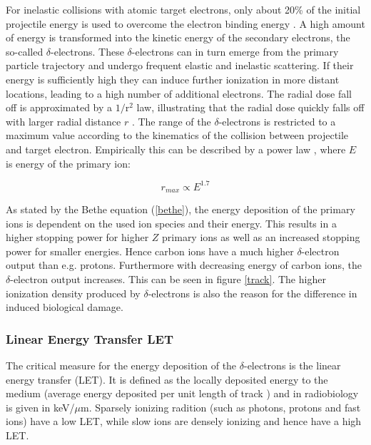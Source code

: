 For inelastic collisions with atomic target electrons, only about 20\% of the initial projectile energy is used to overcome the 
electron binding energy \cite{Kra92}. A high amount of energy is transformed into the kinetic energy of the secondary electrons, the 
so-called $\delta$-electrons. These $\delta$-electrons can in turn emerge from the primary particle trajectory and undergo frequent 
elastic and inelastic scattering. If their energy is sufficiently high they can induce further ionization in more distant locations, 
leading to a high number of additional electrons. The radial dose fall off is approximated by a $\mathrm{1}/\mathrm{r^{2}}$ law, 
illustrating that the radial dose quickly falls off with larger radial distance $r$ \cite{Cha76, Kat99, Ric12}. 
The range of the $\delta$-electrons is restricted to a maximum value according to the kinematics of the collision between projectile 
and target electron. Empirically this can be described by a power law \cite{Kie86}, where $E$ is energy of the primary ion:

\begin{equation}
 r_{max} \propto E^{1.7}
\end{equation}

As stated by the Bethe equation (\ref{bethe}), the energy deposition of the primary ions is dependent on the used ion species and their 
energy. This results in a higher stopping power for higher $Z$ primary ions as well as an increased stopping power for smaller energies. 
Hence carbon ions have a much higher $\delta$-electron output than e.g. protons. Furthermore with decreasing energy of 
carbon ions, the $\delta$-electron output increases. This can be seen in figure \ref{track}. The higher ionization density produced by 
$\delta$-electrons is also the reason for the difference in induced biological damage. 

\subsubsection{Linear Energy Transfer LET}


The critical measure for the energy deposition of the $\delta$-electrons is the linear energy transfer (LET). 
It is defined as the locally deposited energy to the medium (average energy deposited per unit length of track \cite{Hal06}) and 
in radiobiology is given in keV/$\mu$m. Sparsely ionizing radition (such as photons, protons and fast ions) have a low LET, while slow ions 
are densely ionizing and hence have a high LET. 



